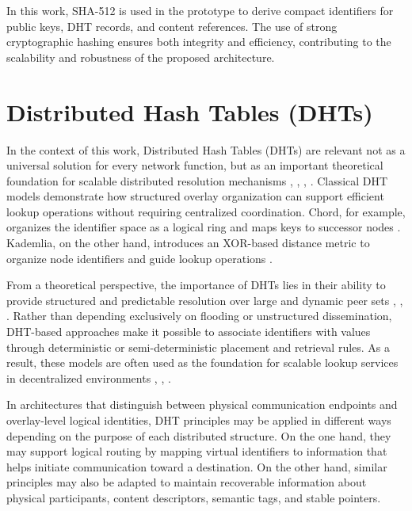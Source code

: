 \documentclass[
  12pt,
  oneside,
  a4paper,
  chapter=TITLE,
  section=TITLE,
  english,
  brazil
]{abntex2}
\begin{document}
In this work, SHA-512 is used in the prototype to derive compact identifiers for public keys, DHT records, and content references. The use of strong cryptographic hashing ensures both integrity and efficiency, contributing to the scalability and robustness of the proposed architecture.

\section{Distributed Hash Tables (DHTs)}

In the context of this work, Distributed Hash Tables (DHTs) are relevant not as a
universal solution for every network function, but as an important theoretical
foundation for scalable distributed resolution mechanisms \cite{stoica2001chord}, \cite{maymounkov2002kademlia}, \cite{rowstron2001pastry}, \cite{augustine2022byzantine}.
Classical DHT models demonstrate how structured overlay organization can support
efficient lookup operations without requiring centralized coordination. Chord, for
example, organizes the identifier space as a logical ring and maps keys to successor
nodes \cite{stoica2001chord}. Kademlia, on the other hand, introduces an XOR-based distance metric to
organize node identifiers and guide lookup operations \cite{maymounkov2002kademlia}.

From a theoretical perspective, the importance of DHTs lies in their ability to
provide structured and predictable resolution over large and dynamic peer sets
\cite{stoica2001chord}, \cite{maymounkov2002kademlia}, \cite{rowstron2001pastry}. Rather than depending exclusively on flooding or unstructured
dissemination, DHT-based approaches make it possible to associate identifiers with
values through deterministic or semi-deterministic placement and retrieval rules.
As a result, these models are often used as the foundation for scalable lookup
services in decentralized environments \cite{stoica2001chord}, \cite{maymounkov2002kademlia}, \cite{augustine2022byzantine}.

In architectures that distinguish between physical communication endpoints and
overlay-level logical identities, DHT principles may be applied in different ways
depending on the purpose of each distributed structure. On the one hand, they may
support logical routing by mapping virtual identifiers to information that helps
initiate communication toward a destination. On the other hand, similar principles
may also be adapted to maintain recoverable information about physical
participants, content descriptors, semantic tags, and stable pointers.
\end{document}
